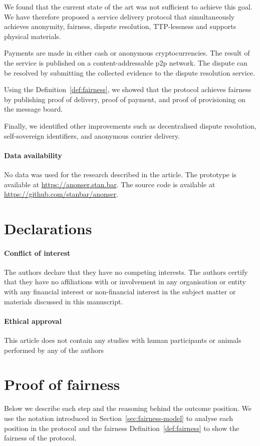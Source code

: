 \documentclass[pdftex,twocolumn,epjc3]{svjour3}
\begin{document}
{We found that the current state of the art was not sufficient to achieve this goal. We have therefore proposed a service delivery protocol that simultaneously achieves anonymity, fairness, dispute resolution, TTP-lessness and supports physical materials.

Payments are made in either cash or anonymous cryptocurrencies. The result of the service is published on a content-addressable p2p network. The dispute can be resolved by submitting the collected evidence to the dispute resolution service. 

Using the Definition~\ref{def:fairness}, we showed that the protocol achieves fairness by publishing proof of delivery, proof of payment, and proof of provisioning on the message board. 

Finally, we identified other improvements such as decentralised dispute resolution, self-sovereign identifiers, and anonymous courier delivery.

\paragraph{Data availability}
No data was used for the research described in the article.
The prototype is available at \url{https://anonser.stan.bar}. 
The source code is available at \url{https://github.com/stanbar/anonser}.

\section*{Declarations}

\paragraph{Conflict of interest} The authors declare that they have no competing interests. The authors certify that they have no affiliations with or involvement in any organisation or entity with any financial interest or non-financial interest in the subject matter or materials discussed in this manuscript.

\paragraph{Ethical approval} This article does not contain any studies with human participants or animals performed by any of the authors


\appendix

\section{Proof of fairness}\label{app:proof-of-fairness}
Below we describe each step and the reasoning behind the outcome position.
We use the notation introduced in Section~\ref{sec:fairness-model} to analyse each position in the protocol and the fairness Definition~\ref{def:fairness} to show the fairness of the protocol.

}
\end{document}
